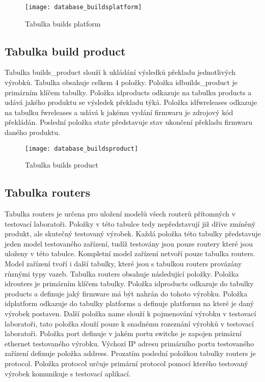 \begin{figure}[h]
  \centering
  \texttt{[image: database\_buildsplatform]}
  \caption{Tabulka builds platform}
  \label{fig:database_buildsplatform}
\end{figure}

\subsection{Tabulka build product}
Tabulka builds\_product slouží k ukládání výsledků překladu jednotlivých výrobků. Tabulka obsahuje celkem 4 položky. Položka idbuilds\_product je primárním klíčem tabulky. Položka idproducts odkazuje na tabulku products a udává jakého produktu se výsledek překladu týká. Položka idfwreleases odkazuje na tabulku fwreleases a udává k jakému vydání firmwaru je zdrojový kód překládán. Poslední položka state představuje stav ukončení překladu firmwaru daného produktu.

\begin{figure}[h]
  \centering
  \texttt{[image: database\_buildsproduct]}
  \caption{Tabulka builds product}
  \label{fig:database_buildsproduct}
\end{figure}

\subsection{Tabulka routers}
Tabulka routers je určena pro uložení modelů všech routerů přítomných v testovací laboratoři. Položky v této tabulce tedy nepředstavují již dříve zmíněný produkt, ale skutečný testovaný výrobek. Každá položka této tabulky představuje jeden model testovaného zařízení, tudíž testovány jsou pouze routery které jsou uloženy v této tabulce. Kompletní model zařízení netvoří pouze tabulka routers. Model zařízení tvoří i další tabulky, které jsou s tabulkou routers provázány různými typy vazeb. Tabulka routers obsahuje následující položky. Položka idrouters je primárním klíčem tabulky. Položka idproducts odkazuje do tabulky products a definuje jaký firmware má být nahrán do tohoto výrobku. Položka idplatform odkazuje do tabulky platforms a definuje platformu na které je daný výrobek postaven. Další položka name slouží k pojmenování výrobku v testovací laboratoři, tato položka slouží pouze k snadnému rozeznání výrobků v testovací laboratoři. Položka port definuje v jakém portu switche je zapojen primární ethernet testovaného výrobku. Výchozí IP adresu  primárního portu testovaného zařízení definuje položka address. Prozatím poslední položkou tabulky routers je protocol. Položka protocol určuje primární protocol pomocí kterého testovaný výrobek komunikuje s testovací aplikací.

